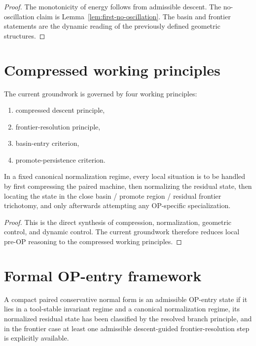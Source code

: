 \begin{proof}
The monotonicity of energy follows from admissible descent. The no-oscillation claim is Lemma~\ref{lem:first-no-oscillation}. The basin and frontier statements are the dynamic reading of the previously defined geometric structures.
\end{proof}

\section{Compressed working principles}
\begin{definition}\label{def:compressed-working-principles}
The current groundwork is governed by four working principles:
\begin{enumerate}[leftmargin=2em]
  \item compressed descent principle,
  \item frontier-resolution principle,
  \item basin-entry criterion,
  \item promote-persistence criterion.
\end{enumerate}
\end{definition}

\begin{theorem}\label{thm:compressed-working-principle-theorem}
In a fixed canonical normalization regime, every local situation is to be handled by first compressing the paired machine, then normalizing the residual state, then locating the state in the close basin / promote region / residual frontier trichotomy, and only afterwards attempting any OP-specific specialization.
\end{theorem}

\begin{proof}
This is the direct synthesis of compression, normalization, geometric control, and dynamic control. The current groundwork therefore reduces local pre-OP reasoning to the compressed working principles.
\end{proof}

\section{Formal OP-entry framework}
\begin{definition}\label{def:admissible-op-entry-state}
A compact paired conservative normal form is an admissible OP-entry state if it lies in a tool-stable invariant regime and a canonical normalization regime, its normalized residual state has been classified by the resolved branch principle, and in the frontier case at least one admissible descent-guided frontier-resolution step is explicitly available.
\end{definition}


